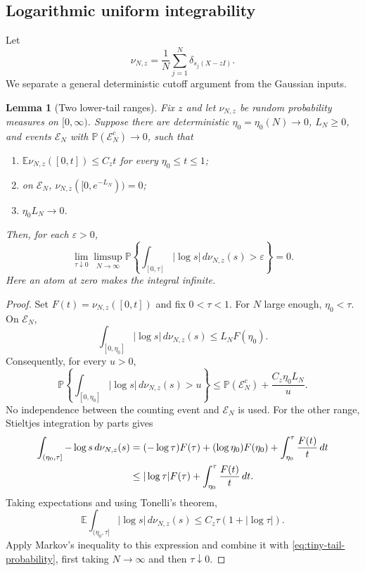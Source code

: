\documentclass[11pt,reqno]{amsart}
\numberwithin{equation}{section}
\theoremstyle{plain}
\newtheorem{lemma}[theorem]{Lemma}
\theoremstyle{definition}
\theoremstyle{remark}
\begin{document}
\subsection{Logarithmic uniform integrability}
Let
\[
 \nu_{N,z}=\frac1N\sum_{j=1}^N\delta_{s_j(X-zI)}.
\]
We separate a general deterministic cutoff argument from the Gaussian
inputs.

\begin{lemma}[Two lower-tail ranges]\label{lem:log-ui}
Fix $z$ and let $\nu_{N,z}$ be random probability measures on $[0,\infty)$.
Suppose there are deterministic $\eta_0=\eta_0(N)\to0$, $L_N\geq0$,
and events $\mathcal E_N$ with $\mathbb P(\mathcal E_N^c)\to0$, such that
\begin{enumerate}[label=\textup{(\roman*)}]
\item $\mathbb E\nu_{N,z}([0,t])\leq C_z t$ for every
$\eta_0\leq t\leq1$;
\item on $\mathcal E_N$, $\nu_{N,z}([0,e^{-L_N}))=0$;
\item $\eta_0L_N\to0$.
\end{enumerate}
Then, for each $\varepsilon>0$,
\begin{equation}\label{eq:log-ui-lower}
 \lim_{\tau\downarrow0}\limsup_{N\to\infty}
 \mathbb P\left\{\int_{[0,\tau]}|\log s|\,d\nu_{N,z}(s)
                         >\varepsilon\right\}=0.
\end{equation}
Here an atom at zero makes the integral infinite.
\end{lemma}
\begin{proof}
Set $F(t)=\nu_{N,z}([0,t])$ and fix $0<\tau<1$. For $N$ large enough,
$\eta_0<\tau$. On $\mathcal E_N$,
\[
 \int_{[0,\eta_0]}|\log s|\,d\nu_{N,z}(s)\leq L_NF(\eta_0).
\]
Consequently, for every $u>0$,
\begin{equation}\label{eq:tiny-tail-probability}
 \mathbb P\left\{\int_{[0,\eta_0]}|\log s|\,d\nu_{N,z}(s)>u\right\}
 \leq\mathbb P(\mathcal E_N^c)+\frac{C_z\eta_0L_N}{u}.
\end{equation}
No independence between the counting event and $\mathcal E_N$ is used.
For the other range, Stieltjes integration by parts gives
\begin{align}
 \int_{(\eta_0,\tau]}-\log s\,d\nu_{N,z}(s)
 &=(-\log\tau)F(\tau)+(\log\eta_0)F(\eta_0)
                         +\int_{\eta_0}^{\tau}\frac{F(t)}t\,dt\notag\\
 &\leq |\log\tau|F(\tau)+\int_{\eta_0}^{\tau}\frac{F(t)}t\,dt.
 \label{eq:middle-tail-parts}
\end{align}
Taking expectations and using Tonelli's theorem,
\begin{equation}\label{eq:middle-tail-expectation}
 \mathbb E\int_{(\eta_0,\tau]}|\log s|\,d\nu_{N,z}(s)
 \leq C_z\tau(1+|\log\tau|).
\end{equation}
Apply Markov's inequality to this expression and combine it with
\eqref{eq:tiny-tail-probability}, first taking $N\to\infty$ and then
$\tau\downarrow0$.
\end{proof}
\end{document}
